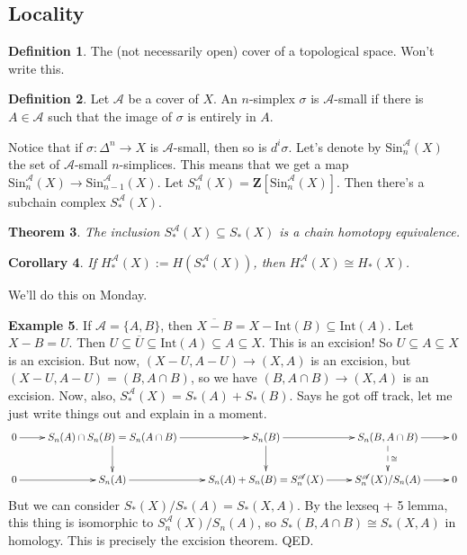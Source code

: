 \documentclass{amsart}
\theoremstyle{theorem}
\newtheorem{theorem}{Theorem}[section]
\newtheorem{corollary}[theorem]{Corollary}
\theoremstyle{definition}
\newtheorem{definition}[theorem]{Definition}
\newtheorem{example}[theorem]{Example}
\newcommand{\Z}{\mathbf Z}
\newcommand{\Sin}{\mathrm{Sin}}
\begin{document}
\subsection{Locality}
\begin{definition}
The (not necessarily open) cover of a topological space. Won't write this.
\end{definition}
\begin{definition}
Let ${\mathscr{A}}$ be a cover of $X$. An $n$-simplex $\sigma$ is ${\mathscr{A}}$-small if there is $A\in \mathscr{A}$ such that the image of $\sigma$ is entirely in $A$.
\end{definition}
Notice that if $\sigma:\Delta^n\to X$ is ${\mathscr{A}}$-small, then so is $d^i\sigma$. Let's denote by $\Sin^{\mathscr{A}}_n(X)$ the set of ${\mathscr{A}}$-small $n$-simplices. This means that we get a map $\Sin^{\mathscr{A}}_n(X)\to \Sin^{\mathscr{A}}_{n-1}(X)$. Let $S^{\mathscr{A}}_n(X)=\Z[\Sin^{\mathscr{A}}_n(X)]$. Then there's a subchain complex $S^{\mathscr{A}}_\ast(X)$.
\begin{theorem}
The inclusion $S^\mathscr{A}_\ast(X)\subseteq S_\ast(X)$ is a chain homotopy equivalence.
\end{theorem}
\begin{corollary}
If $ H^\mathscr{A}_\ast(X):= H(S^\mathscr{A}_\ast(X))$, then $ H^\mathscr{A}_\ast(X)\cong H_\ast(X)$.
\end{corollary}
We'll do this on Monday.
\begin{example}
If $\mathscr{A}=\{A,B\}$, then $\overline{X-B}=X-\mathrm{Int}(B)\subseteq\mathrm{Int}(A)$. Let $X-B=U$. Then $U\subseteq \overline{U}\subseteq \mathrm{Int}(A)\subseteq A\subseteq X$. This is an excision! So $U\subseteq A\subseteq X$ is an excision. But now, $(X-U,A-U)\to (X,A)$ is an excision, but $(X-U,A-U)=(B,A\cap B)$, so we have $(B,A\cap B)\to (X,A)$ is an excision. Now, also, $S^\mathscr{A}_\ast(X)=S_\ast(A)+S_\ast(B)$. Says he got off track, let me just write things out and explain in a moment.
\begin{equation*}
	\xymatrix{0\ar[r] & S_n(A)\cap S_n(B)=S_n(A\cap B)\ar[r]\ar[d] & S_n(B)\ar[r]\ar[d] & S_n(B,A\cap B)\ar[r]\ar@{-->}[d]^\cong & 0\\
	0\ar[r] & S_n(A)\ar[r] & S_n(A)+S_n(B)=S^\mathscr{A}_n(X)\ar[r] & S^\mathscr{A}_n(X)/S_n(A)\ar[r] & 0}
	\end{equation*}
But we can consider $S_\ast(X)/S_\ast(A)=S_\ast(X,A)$. By the lexseq + 5 lemma, this thing is isomorphic to $S^\mathscr{A}_n(X)/S_n(A)$, so $S_\ast(B,A\cap B)\cong S_\ast(X,A)$ in homology. This is precisely the excision theorem. QED.
\end{example}
\end{document}
